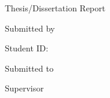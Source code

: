 \begin{titlepage}
    \centering
    \vspace*{1cm}

    {\Large \university\par}
    \vspace{0.35cm}
    {\large \school\par}
    \vspace{0.2cm}
    {\large \department\par}

    \vspace{1.8cm}
    {\Huge\bfseries \thesistitle\par}

    \vspace{1.4cm}
    {\Large Thesis/Dissertation Report\par}

    \vspace{1.2cm}
    {\large Submitted by\par}
    \vspace{0.25cm}
    {\Large\bfseries \studentname\par}
    \vspace{0.15cm}
    {\large Student ID: \studentid\par}

    \vspace{1.0cm}
    {\large Submitted to\par}
    \vspace{0.25cm}
    {\large \department\par}
    {\large \school\par}
    {\large \university\par}

    \vspace{1.0cm}
    {\large Supervisor\par}
    \vspace{0.25cm}
    {\large \supervisorname\par}

    \vfill
    {\large \submissiondate\par}
\end{titlepage}
